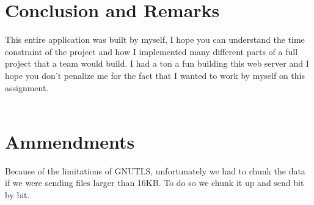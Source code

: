 \documentclass[a4paper,12pt]{article}
\begin{document}
\section{Conclusion and Remarks}

This entire application was built by myself, I hope you can understand
the time constraint of the project and how I implemented many different
parts of a full project that a team would build. I had a ton a fun
building this web server and I hope you don't penalize me for the fact
that I wanted to work by myself on this assignment.\\
\\
\section{Ammendments}

Because of the limitations of GNUTLS, unfortunately we had to chunk the
data if we were sending files larger than 16KB. To do so we chunk it up
and send bit by bit.



 
\end{document}
